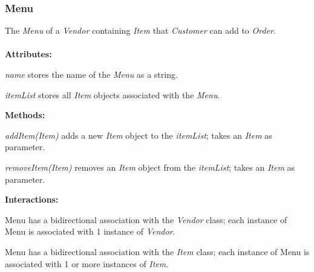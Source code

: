 \subsubsection{Menu}
The \emph{Menu} of a \emph{Vendor} containing \emph{Item} that \emph{Customer} can add to \emph{Order}.\\ \\
\textbf{Attributes:}
\begin{description}
\item\textit{name} stores the name of the \emph{Menu} as a string.
\item\textit{itemList} stores all \emph{Item} objects associated with the \emph{Menu}.
\end{description}
\textbf{Methods:}
\begin{description}
\item\textit{addItem(Item)} adds a new \emph{Item} object to the \textit{itemList}; takes an \emph{Item} as parameter.
\item\textit{removeItem(Item)} removes an \emph{Item} object from the \textit{itemList}; takes an \emph{Item} as parameter.
\end{description}
\textbf{Interactions:}
\begin{description}
\item Menu has a bidirectional association with the \emph{Vendor} class; each instance of Menu is associated with 1 instance of \emph{Vendor}.
\item Menu has a bidirectional association with the \emph{Item} class; each instance of Menu is associated with 1 or more instances of \emph{Item}.
\end{description}
\vspace{.2cm}
